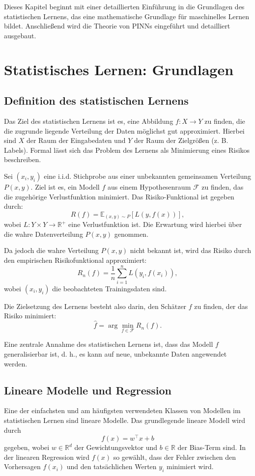 Dieses Kapitel beginnt mit einer detaillierten Einführung in die Grundlagen des statistischen Lernens, das eine mathematische Grundlage für maschinelles Lernen bildet. Anschließend wird die Theorie von PINNs eingeführt und detailliert ausgebaut.

\section{Statistisches Lernen: Grundlagen}

\subsection{Definition des statistischen Lernens}
Das Ziel des statistischen Lernens ist es, eine Abbildung $f : X \to Y$ zu finden, die die zugrunde liegende Verteilung der Daten möglichst gut approximiert. Hierbei sind $X$ der Raum der Eingabedaten und $Y$ der Raum der Zielgrößen (z. B. Labels). Formal lässt sich das Problem des Lernens als Minimierung eines Risikos beschreiben.

Sei $(x_i, y_i)$ eine i.i.d. Stichprobe aus einer unbekannten gemeinsamen Verteilung $P(x, y)$. Ziel ist es, ein Modell $f$ aus einem Hypothesenraum $\mathcal{F}$ zu finden, das die zugehörige Verlustfunktion minimiert. Das Risiko-Funktional ist gegeben durch:
\[
R(f) = \mathbb{E}_{(x, y) \sim P}[L(y, f(x))],
\]
wobei $L : Y \times Y \to \mathbb{R}^+$ eine Verlustfunktion ist. Die Erwartung wird hierbei über die wahre Datenverteilung $P(x, y)$ genommen.

Da jedoch die wahre Verteilung $P(x, y)$ nicht bekannt ist, wird das Risiko durch den empirischen Risikofunktional approximiert:
\[
R_n(f) = \frac{1}{n} \sum_{i=1}^n L(y_i, f(x_i)),
\]
wobei $(x_i, y_i)$ die beobachteten Trainingsdaten sind.

Die Zielsetzung des Lernens besteht also darin, den Schätzer $f$ zu finden, der das Risiko minimiert:
\[
\hat{f} = \arg \min_{f \in \mathcal{F}} R_n(f).
\]

Eine zentrale Annahme des statistischen Lernens ist, dass das Modell $f$ generalisierbar ist, d. h., es kann auf neue, unbekannte Daten angewendet werden.

\subsection{Lineare Modelle und Regression}
Eine der einfachsten und am häufigsten verwendeten Klassen von Modellen im statistischen Lernen sind lineare Modelle. Das grundlegende lineare Modell wird durch
\[
f(x) = w^\top x + b
\]
gegeben, wobei $w \in \mathbb{R}^d$ der Gewichtungsvektor und $b \in \mathbb{R}$ der Bias-Term sind. In der linearen Regression wird $f(x)$ so gewählt, dass der Fehler zwischen den Vorhersagen $f(x_i)$ und den tatsächlichen Werten $y_i$ minimiert wird.

